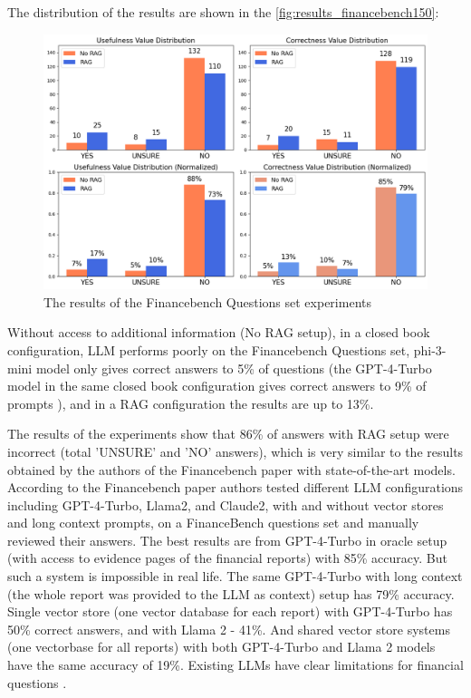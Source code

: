 The distribution of the results are shown in the \autoref{fig:results_financebench150}:
\begin{figure}[H]
\centering
\includegraphics[width=1\textwidth]{Figures/results_financebench150.png}
\caption{The results of the Financebench Questions set experiments}
\label{fig:results_financebench150}
\end{figure}

Without access to additional information (No RAG setup), in a closed book configuration, LLM performs poorly on the Financebench Questions set, phi-3-mini model only gives correct answers to 5\% of questions (the GPT-4-Turbo model in the same closed book configuration gives correct answers to 9\% of prompts \cite{Islam.20Nov2023}), and in a RAG configuration the results are up to 13\%.

The results of the experiments show that 86\% of answers with RAG setup were incorrect (total 'UNSURE' and 'NO' answers), which is very similar to the results obtained by the authors of the Financebench paper with state-of-the-art models. According to the Financebench paper authors tested different LLM configurations including GPT-4-Turbo, Llama2, and Claude2, with and without vector stores and long context prompts, on a FinanceBench questions set and manually reviewed their answers. The best results are from GPT-4-Turbo in oracle setup (with access to evidence pages of the financial reports) with 85\% accuracy. But such a system is impossible in real life. The same GPT-4-Turbo with long context (the whole report was provided to the LLM as context) setup has 79\% accuracy. Single vector store (one vector database for each report) with GPT-4-Turbo has 50\% correct answers, and with Llama 2 - 41\%. And shared vector store systems (one vectorbase for all reports) with both GPT-4-Turbo and Llama 2 models have the same accuracy of 19\%. Existing LLMs have clear limitations for financial questions \cite{Islam.20Nov2023}. 

